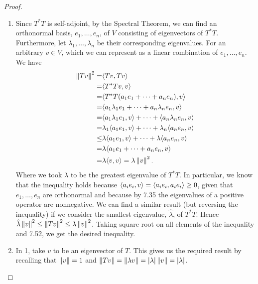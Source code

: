 \begin{proof}
 \begin{enumerate}
     \item Since $T^\ast T$ is self-adjoint, by the Spectral Theorem, we can find an orthonormal basis, $e_1,\dots,e_n$, of $V$ consisting of eigenvectors of $T^\ast T$. Furthermore, let $\lambda_1,\dots,\lambda_n$ be their corresponding eigenvalues. For an arbitrary $v\in V$, which we can represent as a linear combination of $e_1,\dots,e_n$. We have
     \begin{align*}
         \left\lVert Tv\right\rVert^2
         =& \langle Tv,Tv\rangle \\
         =& \langle T^\ast Tv,v\rangle\\
         =& \langle T^\ast T(a_1e_1+\dots+a_ne_n),v\rangle\\
         =& \langle a_1\lambda_1e_1+\dots+a_n\lambda_ne_n,v\rangle\\
         =& \langle a_1\lambda_1e_1,v\rangle+\dots+\langle a_n\lambda_ne_n,v\rangle\\
         =& \lambda_1\langle a_1e_1,v\rangle+\dots+\lambda_n\langle a_ne_n,v\rangle\\
         \leq& \lambda\langle a_1e_1,v\rangle+\dots+\lambda\langle a_ne_n,v\rangle\\
         =& \lambda\langle a_1e_1+\dots+a_ne_n,v\rangle\\
         =& \lambda\langle v,v\rangle =\lambda\left\lVert v\right\rVert^2.
     \end{align*}
     Where we took $\lambda$ to be the greatest eigenvalue of $T^\ast T$. In particular, we know that the inequality holds because $\langle a_ie_i,v\rangle=\langle a_ie_i,a_ie_i\rangle\geq 0$, given that $e_1,\dots,e_n$ are orthonormal and because by 7.35 the eigenvalues of a positive operator are nonnegative. We can find a similar result (but reversing the inequality) if we consider the smallest eigenvalue, $\hat{\lambda}$, of $T^\ast T$. Hence $\hat{\lambda}\left\lVert v\right\rVert^2 \leq\left\lVert Tv\right\rVert^2 \leq \lambda\left\lVert v\right\rVert^2$. Taking square root on all elements of the inequality and 7.52, we get the desired inequality.
     \item In 1, take $v$ to be an eigenvector of $T$. This gives us the required result by recalling that $\left\lVert v\right\rVert=1$ and $\left\lVert Tv\right\rVert =\left\lVert \lambda v\right\rVert =\left\lvert \lambda\right\rvert\left\lVert v\right\rVert =\left\lvert \lambda\right\rvert$.
 \end{enumerate}
\end{proof}